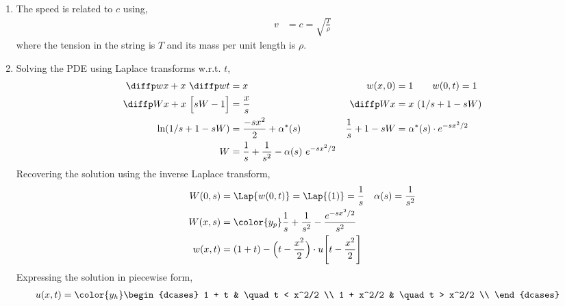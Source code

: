 \begin{enumerate}
    \item The speed is related to $ c $ using,
          \begin{align}
              v & = c = \sqrt{\frac{T}{\rho}}
          \end{align}
          where the tension in the string is $ T $ and its mass per unit length is
          $ \rho $.

    \item Solving the PDE using Laplace transforms w.r.t. $ t $,
          \begin{align}
              \diffp wx + x\ \diffp wt        & = x                             &
              w(x, 0)                         & = 1 \qquad w(0, t) = 1            \\
              \diffp Wx + x\ \Big[sW - 1\Big] & = \frac{x}{s}                   &
              \diffp Wx                       & = x\ (1/s + 1 - sW)               \\
              \ln(1/s + 1 -sW)                & = \frac{-sx^2}{2} + \alpha^*(s) &
              \frac{1}{s} + 1 - sW            & = \alpha^*(s) \cdot e^{-sx^2/2}   \\
              W                               & =
              \frac{1}{s} + \frac{1}{s^2} - \alpha(s)\ e^{-sx^2/2}
          \end{align}
          Recovering the solution using the inverse Laplace transform,
          \begin{align}
              W(0, s)       & = \Lap\{w(0, t)\} = \Lap\{(1)\}
              = \frac{1}{s} &
              \alpha(s)     & = \frac{1}{s^2}                           \\
              W(x, s)       & = \color{y_p} \frac{1}{s} + \frac{1}{s^2}
              - \frac{e^{-sx^2/2}}{s^2}                                 \\
              w(x, t)       & = (1 + t) - \Big( t - \frac{x^2}{2} \Big)
              \cdot u \Bigg[ t - \frac{x^2}{2} \Bigg]
          \end{align}
          Expressing the solution in piecewise form,
          \begin{align}
              u(x, t) & = \color{y_h} \begin{dcases}
                                          1 + t     & \quad t < x^2/2 \\
                                          1 + x^2/2 & \quad t > x^2/2 \\
                                      \end{dcases}
          \end{align}


\end{enumerate}
